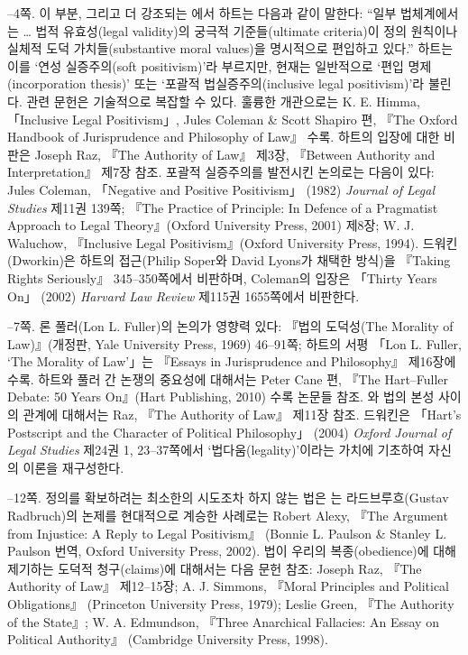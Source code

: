 {--4쪽.  이 부분, 그리고 더 강조되는 에서 하트는
다음과 같이 말한다: “일부 법체계에서는 \ldots{} 법적 유효성(legal
validity)의 궁극적 기준들(ultimate criteria)이 정의 원칙이나 실체적 도덕
가치들(substantive moral values)을 명시적으로 편입하고 있다.” 하트는
이를 ‘연성 실증주의(soft positivism)’라 부르지만, 현재는 일반적으로
‘편입 명제(incorporation thesis)’ 또는 ‘포괄적 법실증주의(inclusive
legal positivism)’라 불린다. 관련 문헌은 기술적으로 복잡할 수 있다.
훌륭한 개관으로는 K. E. Himma, 「Inclusive Legal Positivism」, Jules
Coleman \& Scott Shapiro 편, 『The Oxford Handbook of Jurisprudence and
Philosophy of Law』 수록. 하트의 입장에 대한 비판은 Joseph Raz, 『The
Authority of Law』 제3장, 『Between Authority and Interpretation』 제7장
참조. 포괄적 실증주의를 발전시킨 논의로는 다음이 있다: Jules Coleman,
「Negative and Positive Positivism」 (1982) \emph{Journal of Legal
Studies} 제11권 139쪽; 『The Practice of Principle: In Defence of a
Pragmatist Approach to Legal Theory』(Oxford University Press, 2001)
제8장; W. J. Waluchow, 『Inclusive Legal Positivism』(Oxford University
Press, 1994). 드워킨(Dworkin)은 하트의 접근(Philip Soper와 David Lyons가
채택한 방식)을 『Taking Rights Seriously』 345--350쪽에서 비판하며,
Coleman의 입장은 「Thirty Years On」 (2002) \emph{Harvard Law Review}
제115권 1655쪽에서 비판한다.

--7쪽.  론 풀러(Lon L. Fuller)의 논의가 영향력 있다: 『법의
도덕성(The Morality of Law)』(개정판, Yale University Press, 1969)
46--91쪽; 하트의 서평 「Lon L. Fuller, `The Morality of Law'」는
『Essays in Jurisprudence and Philosophy』 제16장에 수록. 하트와 풀러 간
논쟁의 중요성에 대해서는 Peter Cane 편, 『The Hart--Fuller Debate: 50
Years On』(Hart Publishing, 2010) 수록 논문들 참조. 와 법의 본성 사이의 관계에 대해서는 Raz, 『The Authority of
Law』 제11장 참조. 드워킨은 「Hart's Postscript and the Character of
Political Philosophy」 (2004) \emph{Oxford Journal of Legal Studies}
제24권 1, 23--37쪽에서 ‘법다움(legality)’이라는 가치에 기초하여 자신의
이론을 재구성한다.

--12쪽.  정의를 확보하려는 최소한의 시도조차 하지 않는 법은 는 라드브루흐(Gustav Radbruch)의 논제를 현대적으로 계승한
사례로는 Robert Alexy, 『The Argument from Injustice: A Reply to Legal
Positivism』 (Bonnie L. Paulson \& Stanley L. Paulson 번역, Oxford
University Press, 2002). 법이 우리의 복종(obedience)에 대해 제기하는
도덕적 청구(claims)에 대해서는 다음 문헌 참조: Joseph Raz, 『The
Authority of Law』 제12--15장; A. J. Simmons, 『Moral Principles and
Political Obligations』 (Princeton University Press, 1979); Leslie
Green, 『The Authority of the State』; W. A. Edmundson, 『Three
Anarchical Fallacies: An Essay on Political Authority』 (Cambridge
University Press, 1998).

}
